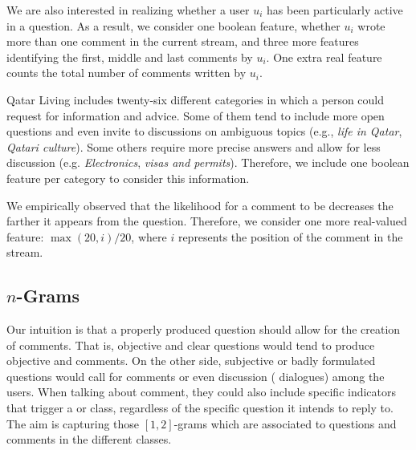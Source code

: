 We are also interested in realizing whether a user $u_i$ has been particularly 
active in a question. As a result, we consider one boolean feature, whether 
$u_i$ wrote more than one comment in the current stream, and three more features 
identifying the first, middle and last comments by $u_i$. One extra real feature 
counts the total number of comments written by $u_i$.

Qatar Living includes twenty-six different categories in which a person could 
request for information and advice. Some of them tend to include more open 
questions and even invite to discussions on ambiguous topics (e.g., \textit{life 
in Qatar}, \textit{Qatari culture}). Some others require more precise answers 
and allow for less discussion (e.g. \textit{Electronics}, \textit{visas and 
permits}). Therefore, we include one boolean feature per category to consider 
this information. 
 
We empirically observed that the likelihood for a comment to be \good decreases 
the farther it appears from the question. Therefore, we consider one more 
real-valued feature: $\max(20, i)/20$, where $i$ represents the position of 
the comment in the stream.
 



\subsection{$n$-Grams }
\label{ssub:ngrams}

Our intuition is that a properly produced question should allow for the 
creation of \good comments. That is, objective and clear questions would tend to 
produce objective and \good comments. On the other side, subjective or badly 
formulated questions would call for \bad comments or even discussion (\ie 
dialogues) among the users. When talking about comment, they could also include 
specific indicators that trigger a \good or \bad class, regardless of the 
specific question it intends to reply to. The aim is capturing those 
$[1,2]$-grams which are associated to questions and comments in the different 
classes.

